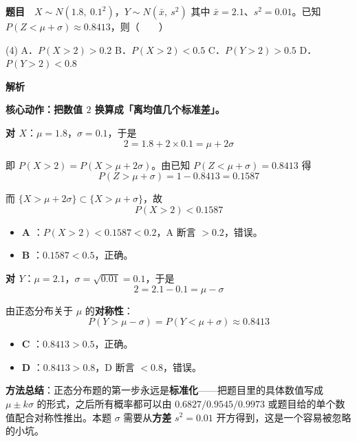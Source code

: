 \par\medskip



\textbf{题目}　$X\sim N\left(1.8,\ 0.1^{2}\right)$，$Y\sim N\left(\bar x,\ s^{2}\right)$ 其中 $\bar x=2.1$、$s^{2}=0.01$。已知 $P(Z<\mu+\sigma)\approx0.8413$，则（　　）

\begin{gkopts}(4)
\task A．$P(X>2)>0.2$
\task B．$P(X>2)<0.5$
\task C．$P(Y>2)>0.5$
\task D．$P(Y>2)<0.8$
\end{gkopts}

\textbf{解析}

\textbf{核心动作：把数值 $2$ 换算成「离均值几个标准差」。}

\textbf{对 $X$}：$\mu=1.8$，$\sigma=0.1$，于是
\[2=1.8+2\times0.1=\mu+2\sigma\]

即 $P(X>2)=P(X>\mu+2\sigma)$。由已知 $P(Z<\mu+\sigma)=0.8413$ 得
\[P(Z>\mu+\sigma)=1-0.8413=0.1587\]

而 $\{X>\mu+2\sigma\}\subset\{X>\mu+\sigma\}$，故
\[P(X>2)<0.1587\]

\begin{itemize}
\item \textbf{A }：$P(X>2)<0.1587<0.2$，A 断言 $>0.2$，错误。
\item \textbf{B }：$0.1587<0.5$，正确。
\end{itemize}

\textbf{对 $Y$}：$\mu=2.1$，$\sigma=\sqrt{0.01}=0.1$，于是
\[2=2.1-0.1=\mu-\sigma\]

由正态分布关于 $\mu$ 的\textbf{对称性}：
\[P(Y>\mu-\sigma)=P(Y<\mu+\sigma)\approx0.8413\]

\begin{itemize}
\item \textbf{C }：$0.8413>0.5$，正确。
\item \textbf{D }：$0.8413>0.8$，D 断言 $<0.8$，错误。
\end{itemize}


\begin{gktip}
\textbf{方法总结}：正态分布题的第一步永远是\textbf{标准化}——把题目里的具体数值写成 $\mu\pm k\sigma$ 的形式，之后所有概率都可以由 $0.6827/0.9545/0.9973$ 或题目给的单个数值配合对称性推出。本题 $\sigma$ 需要从\textbf{方差} $s^2=0.01$ 开方得到，这是一个容易被忽略的小坑。
\end{gktip}

